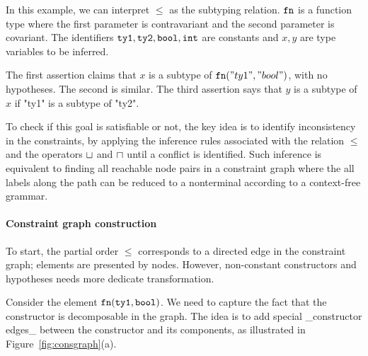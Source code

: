 In this example, we can interpret $\leq$ as the subtyping relation. $\mathtt{fn}$ is
a function type where the first parameter is contravariant and the second
parameter is covariant. The identifiers $\mathtt{ty1}, \mathtt{ty2}, \mathtt{bool},
\mathtt{int}$ are constants and $x, y$ are type variables to be inferred.

The first assertion claims that $x$ is a subtype of $\mathtt{fn} ("ty1",
"bool")$, with no hypotheses. The second is similar.
The third assertion says that $y$ is a subtype of $x$ if "ty1" is
a subtype of "ty2".

To check if this goal is satisfiable or not, the key idea is to
identify inconsistency in the constraints, by applying the inference
rules associated with the relation $\leq$ and the operators $\sqcup$
and $\sqcap$ until a conflict is identified. Such
inference is equivalent to finding all reachable node pairs in a
constraint graph where the all labels along the path can be reduced to
a nonterminal according to a context-free grammar.

\paragraph{Constraint graph construction}
To start, the partial order $\leq$ corresponds to a directed edge in
the constraint graph; elements are presented by nodes. However,
non-constant constructors and hypotheses needs more dedicate
transformation.

Consider the element $\mathtt{fn} (\mathtt{ty1}, \mathtt{bool})$. We need to capture
the fact that the constructor is decomposable in the graph. The idea is to add
special _constructor edges_ between the constructor and its
components, as illustrated in Figure~\ref{fig:consgraph}(a).

